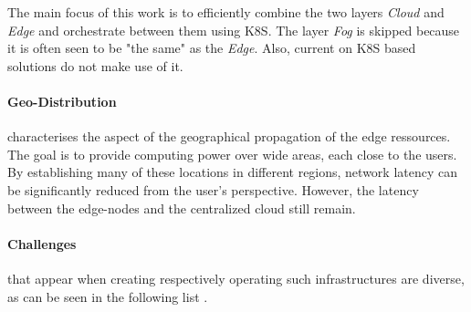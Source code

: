 \documentclass[MSC,Master,english]{twbook}%
\begin{document}
The main focus of this work is to efficiently combine the two layers \textit{Cloud} and \textit{Edge} and orchestrate between them using \ac{K8S}. The layer \textit{Fog} is skipped because it is often seen to be "the same" as the \textit{Edge}. Also, current on \ac{K8S} based solutions do not make use of it. 

\paragraph{Geo-Distribution} characterises the aspect of the geographical propagation of the edge ressources. The goal is to provide computing power over wide areas, each close to the users. By establishing many of these locations in different regions, network latency can be significantly reduced from the user's perspective. However, the latency between the edge-nodes and the centralized cloud still remain.

\paragraph{Challenges} that appear when creating respectively operating such infrastructures are diverse, as can be seen in the following list \cite{intro-edge}.
\end{document}
